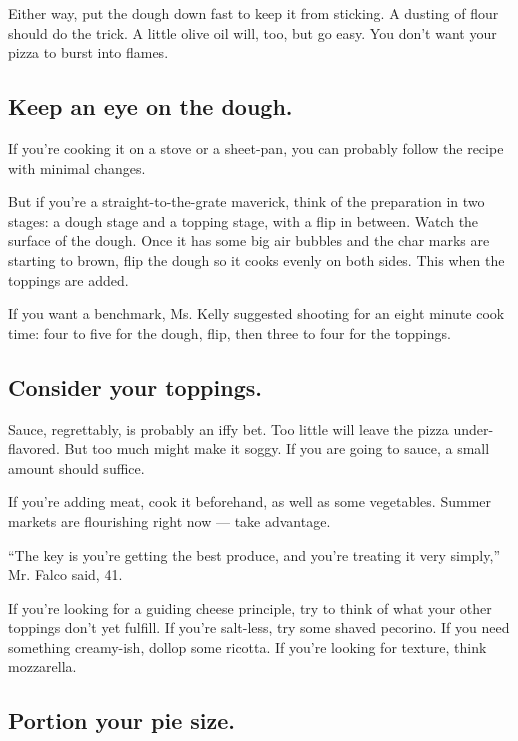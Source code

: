 Either way, put the dough down fast to keep it from sticking. A dusting
of flour should do the trick. A little olive oil will, too, but go easy.
You don't want your pizza to burst into flames.

\hypertarget{keep-an-eye-on-the-dough}{%
\subsection{Keep an eye on the dough.}\label{keep-an-eye-on-the-dough}}

If you're cooking it on a stove or a sheet-pan, you can probably follow
the recipe with minimal changes.

But if you're a straight-to-the-grate maverick, think of the preparation
in two stages: a dough stage and a topping stage, with a flip in
between. Watch the surface of the dough. Once it has some big air
bubbles and the char marks are starting to brown, flip the dough so it
cooks evenly on both sides. This when the toppings are added.

If you want a benchmark, Ms. Kelly suggested shooting for an eight
minute cook time: four to five for the dough, flip, then three to four
for the toppings.

\hypertarget{consider-your-toppings}{%
\subsection{Consider your toppings.}\label{consider-your-toppings}}

Sauce, regrettably, is probably an iffy bet. Too little will leave the
pizza under-flavored. But too much might make it soggy. If you are going
to sauce, a small amount should suffice.

If you're adding meat, cook it beforehand, as well as some vegetables.
Summer markets are flourishing right now --- take advantage.

``The key is you're getting the best produce, and you're treating it
very simply,'' Mr. Falco said, 41.

If you're looking for a guiding cheese principle, try to think of what
your other toppings don't yet fulfill. If you're salt-less, try some
shaved pecorino. If you need something creamy-ish, dollop some ricotta.
If you're looking for texture, think mozzarella.

\hypertarget{portion-your-pie-size}{%
\subsection{Portion your pie size.}\label{portion-your-pie-size}}

